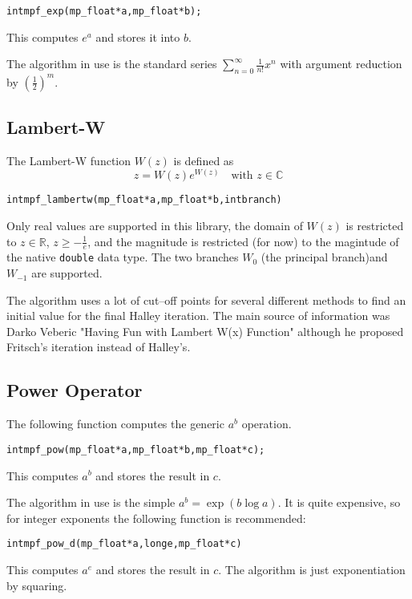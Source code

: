 \documentclass[a4paper]{book}
\newcommand{\field}[1]{\mathbb{#1}}
\newcommand{\R}{\field{R}}
\newcommand{\C}{\field{C}}
\theoremstyle{definition}
\theoremstyle{remark}
\begin{document}
\begin{alltt}
int  mpf_exp(mp_float *a, mp_float *b);
\end{alltt}

This computes $e^a$ and stores it into $b$.

The algorithm in use is the standard series $\sum_{n=0}^{\infty} {\frac{1}{n!}}x^n$ with argument reduction by $\left(\tfrac{1}{2}\right)^m$\cite{arndt2010matters}.

\subsection{Lambert-W}
The Lambert-W function $W(z)$ is defined as
\begin{equation}
z = W(z)e^{W(z)}\quad\text{with } z\in\C
\end{equation}
 
\begin{alltt}
int  mpf_lambertw(mp_float * a, mp_float * b, int branch)
\end{alltt}

Only real values are supported in this library, the domain of $W(z)$ is restricted to $z\in\R$, $z \ge -\tfrac{1}{e}$, and the magnitude is restricted (for now) to the magintude of the native {\texttt{double}} data type. The two branches $W_0$ (the principal branch)and $W_{ -1}$ are supported.

The algorithm uses a lot of cut--off points for several different methods to find an initial value for the final Halley iteration. The main source of information was Darko Veberic "Having Fun with Lambert W(x) Function"\cite{veberic2010having} although he proposed Fritsch's iteration\cite{fritsch1973solution} instead of Halley's.

\subsection{Power Operator}
The following function computes the generic $a^b$ operation.  

\begin{alltt}
int  mpf_pow(mp_float *a, mp_float *b, mp_float *c);
\end{alltt}
This computes $a^b$ and stores the result in $c$.

The algorithm in use is the simple $a^b = \exp(b\log a)$. It is quite expensive, so for integer exponents the following function is recommended:
\begin{alltt}
int  mpf_pow_d(mp_float * a, long e, mp_float * c)
\end{alltt}
This computes $a^e$ and stores the result in $c$. The algorithm is just exponentiation by squaring.
\end{document}
